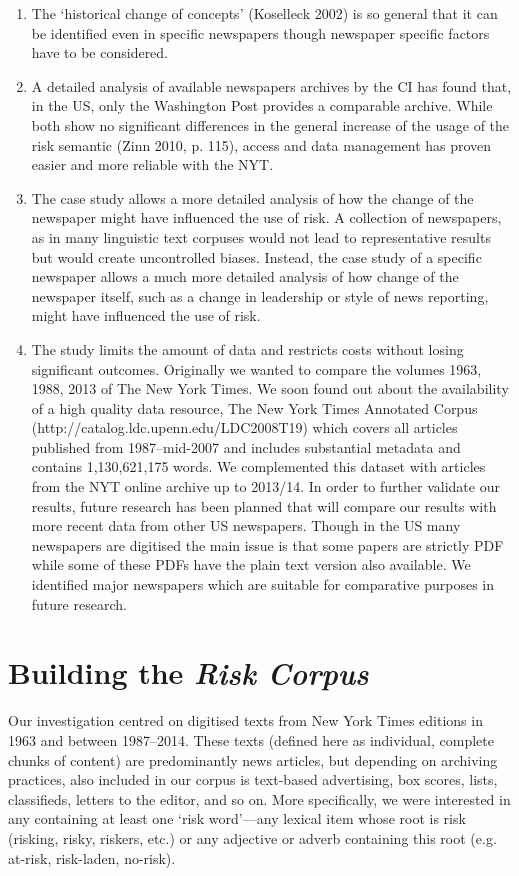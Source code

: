 \begin{enumerate}
\item The `historical change of concepts' (Koselleck 2002) is so general that it can be identified even in specific newspapers though newspaper specific factors have to be considered.
\item A detailed analysis of available newspapers archives by the CI has found that, in the US, only the Washington Post provides a comparable archive. While both show no significant differences in the general increase of the usage of the risk semantic (Zinn 2010, p. 115), access and data management has proven easier and more reliable with the NYT.
\item The case study allows a more detailed analysis of how the change of the newspaper might have influenced the use of risk. A collection of newspapers, as in many linguistic text corpuses would not lead to representative results but would create uncontrolled biases. Instead, the case study of a specific newspaper allows a much more detailed analysis of how change of the newspaper itself, such as a change in leadership or style of news reporting, might have influenced the use of risk.
\item The study limits the amount of data and restricts costs without losing significant outcomes. Originally we wanted to compare the volumes 1963, 1988, 2013 of The New York Times. We soon found out about the availability of a high quality data resource, The New York Times Annotated Corpus (http://catalog.ldc.upenn.edu/LDC2008T19) which covers all articles published from 1987--mid-2007 and includes substantial metadata and contains 1,130,621,175 words. We complemented this dataset with articles from the NYT online archive up to 2013/14.
In order to further validate our results, future research has been planned that will compare our results with more recent data from other US newspapers. Though in the US many newspapers are digitised the main issue is that some papers are strictly PDF while some of these PDFs have the plain text version also available. We identified major newspapers which are suitable for comparative purposes in future research.
\end{enumerate}

\section{Building the \emph{Risk Corpus}}

Our investigation centred on digitised texts from New York Times editions in 1963 and between 1987--2014. These texts (defined here as individual, complete chunks of content) are predominantly news articles, but depending on archiving practices, also included in our corpus is text-based advertising, box scores, lists, classifieds, letters to the editor, and so on. More specifically, we were interested in any containing at least one `risk word'---any lexical item whose root is risk (risking, risky, riskers, etc.) or any adjective or adverb containing this root (e.g. at-risk, risk-laden, no-risk).

